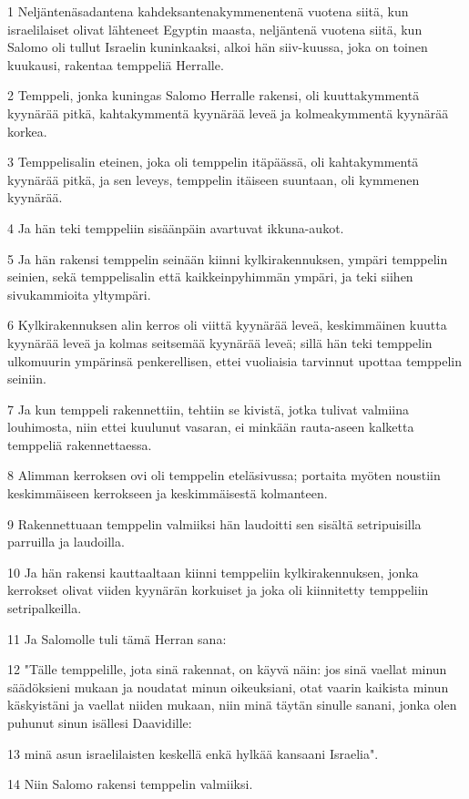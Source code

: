 \par 1 Neljäntenäsadantena kahdeksantenakymmenentenä vuotena siitä, kun israelilaiset olivat lähteneet Egyptin maasta, neljäntenä vuotena siitä, kun Salomo oli tullut Israelin kuninkaaksi, alkoi hän siiv-kuussa, joka on toinen kuukausi, rakentaa temppeliä Herralle.
\par 2 Temppeli, jonka kuningas Salomo Herralle rakensi, oli kuuttakymmentä kyynärää pitkä, kahtakymmentä kyynärää leveä ja kolmeakymmentä kyynärää korkea.
\par 3 Temppelisalin eteinen, joka oli temppelin itäpäässä, oli kahtakymmentä kyynärää pitkä, ja sen leveys, temppelin itäiseen suuntaan, oli kymmenen kyynärää.
\par 4 Ja hän teki temppeliin sisäänpäin avartuvat ikkuna-aukot.
\par 5 Ja hän rakensi temppelin seinään kiinni kylkirakennuksen, ympäri temppelin seinien, sekä temppelisalin että kaikkeinpyhimmän ympäri, ja teki siihen sivukammioita yltympäri.
\par 6 Kylkirakennuksen alin kerros oli viittä kyynärää leveä, keskimmäinen kuutta kyynärää leveä ja kolmas seitsemää kyynärää leveä; sillä hän teki temppelin ulkomuurin ympärinsä penkerellisen, ettei vuoliaisia tarvinnut upottaa temppelin seiniin.
\par 7 Ja kun temppeli rakennettiin, tehtiin se kivistä, jotka tulivat valmiina louhimosta, niin ettei kuulunut vasaran, ei minkään rauta-aseen kalketta temppeliä rakennettaessa.
\par 8 Alimman kerroksen ovi oli temppelin eteläsivussa; portaita myöten noustiin keskimmäiseen kerrokseen ja keskimmäisestä kolmanteen.
\par 9 Rakennettuaan temppelin valmiiksi hän laudoitti sen sisältä setripuisilla parruilla ja laudoilla.
\par 10 Ja hän rakensi kauttaaltaan kiinni temppeliin kylkirakennuksen, jonka kerrokset olivat viiden kyynärän korkuiset ja joka oli kiinnitetty temppeliin setripalkeilla.
\par 11 Ja Salomolle tuli tämä Herran sana:
\par 12 "Tälle temppelille, jota sinä rakennat, on käyvä näin: jos sinä vaellat minun säädöksieni mukaan ja noudatat minun oikeuksiani, otat vaarin kaikista minun käskyistäni ja vaellat niiden mukaan, niin minä täytän sinulle sanani, jonka olen puhunut sinun isällesi Daavidille:
\par 13 minä asun israelilaisten keskellä enkä hylkää kansaani Israelia".
\par 14 Niin Salomo rakensi temppelin valmiiksi.
